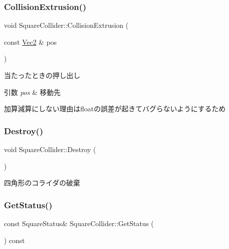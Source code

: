 \subsubsection{\texorpdfstring{Collision\+Extrusion()}{CollisionExtrusion()}}
{\footnotesize\ttfamily void Square\+Collider\+::\+Collision\+Extrusion (\begin{DoxyParamCaption}\item[{const \mbox{\hyperlink{common_8h_ae148fff5818e9444b4ab2288829559bf}{Vec2}} \&}]{pos }\end{DoxyParamCaption})}



当たったときの押し出し 


\begin{DoxyParams}{引数}
{\em pos} & 移動先\\
\hline
\end{DoxyParams}
加算減算にしない理由はfloatの誤差が起きてバグらないようにするため \mbox{\label{class_square_collider_a83273e0e63692aa8020b8deedd456886}} 
\subsubsection{\texorpdfstring{Destroy()}{Destroy()}}
{\footnotesize\ttfamily void Square\+Collider\+::\+Destroy (\begin{DoxyParamCaption}{ }\end{DoxyParamCaption})}



四角形のコライダの破棄 

\mbox{\label{class_square_collider_ac437bc1bed951c82ca25d2b17a7b2e0f}} 
\subsubsection{\texorpdfstring{Get\+Status()}{GetStatus()}}
{\footnotesize\ttfamily const Square\+Status\& Square\+Collider\+::\+Get\+Status (\begin{DoxyParamCaption}{ }\end{DoxyParamCaption}) const\hspace{0.3cm}{\ttfamily [inline]}}



